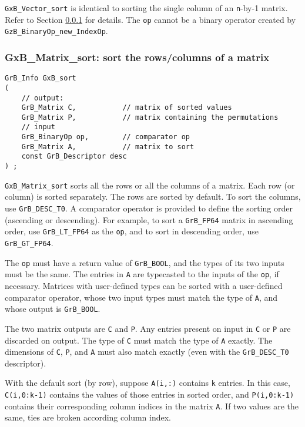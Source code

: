 \documentclass[12pt]{article}
\begin{document}
\verb'GxB_Vector_sort' is identical to sorting the single column of an
\verb'n'-by-1 matrix.
Refer to Section \ref{matrix_sort} for details.
%
The \verb'op' cannot be a binary operator
created by \verb'GzB_BinaryOp_new_IndexOp'.

\subsubsection{{\sf GxB\_Matrix\_sort:} sort the rows/columns of a matrix}
\label{matrix_sort}

\begin{mdframed}[userdefinedwidth=6in]
{\footnotesize
\begin{verbatim}
GrB_Info GxB_sort
(
    // output:
    GrB_Matrix C,           // matrix of sorted values
    GrB_Matrix P,           // matrix containing the permutations
    // input
    GrB_BinaryOp op,        // comparator op
    GrB_Matrix A,           // matrix to sort
    const GrB_Descriptor desc
) ;
\end{verbatim}
} \end{mdframed}

\verb'GxB_Matrix_sort' sorts all the rows or all the columns of a matrix.
Each row (or column) is sorted separately.  The rows are sorted by default.
To sort the columns, use \verb'GrB_DESC_T0'.  A comparator operator is
provided to define the sorting order (ascending or descending).
For example, to sort a \verb'GrB_FP64' matrix in ascending order,
use \verb'GrB_LT_FP64' as the \verb'op', and to sort in descending order,
use \verb'GrB_GT_FP64'.

The \verb'op' must have a return value of \verb'GrB_BOOL', and the types of
its two inputs must be the same.  The entries in \verb'A' are typecasted to
the inputs of the \verb'op', if necessary.  Matrices with user-defined types
can be sorted with a user-defined comparator operator, whose two input types
must match the type of \verb'A', and whose output is \verb'GrB_BOOL'.

The two matrix outputs are \verb'C' and \verb'P'.  Any entries present on input
in \verb'C' or \verb'P' are discarded on output.  The type of \verb'C' must
match the type of \verb'A' exactly.  The dimensions of \verb'C', \verb'P', and
\verb'A' must also match exactly (even with the \verb'GrB_DESC_T0'
descriptor).

With the default sort (by row), suppose \verb'A(i,:)' contains \verb'k'
entries.  In this case, \verb'C(i,0:k-1)' contains the values of those entries
in sorted order, and \verb'P(i,0:k-1)' contains their corresponding column
indices in the matrix \verb'A'.  If two values are the same, ties are broken
according column index.
\end{document}
